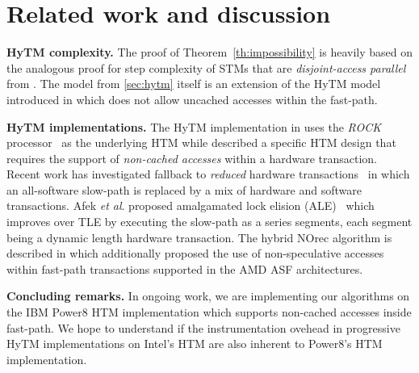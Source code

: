 \section{Related work and discussion}
\label{sec:rel}
%
\vspace{1mm}\noindent\textbf{HyTM complexity.}
The proof of Theorem~\ref{th:impossibility} is heavily based on the analogous proof for step complexity of
STMs that are \emph{disjoint-access parallel} from \cite{prog15-pact}.
The model from \cref{sec:hytm} itself is an extension of the HyTM model introduced in \cite{hytm14disc}
which does not allow uncached accesses within the fast-path.

\vspace{1mm}\noindent\textbf{HyTM implementations.}
The HyTM implementation in \cite{damronhytm} uses the \emph{ROCK} processor~\cite{rock} as the underlying HTM
while \cite{kumarhytm} described a specific HTM design that requires the support of \emph{non-cached accesses}
within a hardware transaction. 
Recent work has investigated fallback to \emph{reduced} hardware transactions~\cite{MS13}
in which an all-software slow-path is replaced by a mix of hardware and software transactions. 
Afek \emph{et al}. proposed amalgamated lock elision (ALE)~\cite{ale15} which improves over TLE
by executing the slow-path as a series segments, each segment being a dynamic length hardware transaction.
The hybrid NOrec algorithm is described in \cite{hynorecriegel} which additionally proposed the use of non-speculative accesses
within fast-path transactions supported in the AMD ASF architectures.

\vspace{1mm}\noindent\textbf{Concluding remarks.}
In ongoing work, we are implementing our algorithms on the IBM Power8 HTM implementation which supports
non-cached accesses inside fast-path. We hope to understand if the instrumentation ovehead in
progressive HyTM implementations on Intel's HTM are also inherent to Power8's HTM implementation.